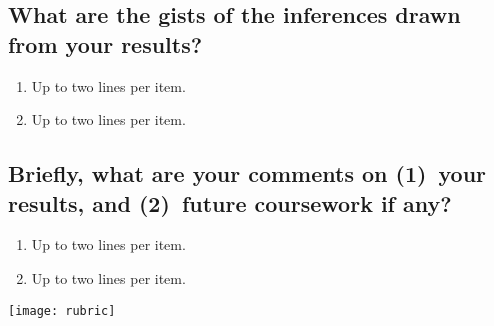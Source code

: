 \subsection{What are the gists of the inferences drawn from your results?}
\begin{enumerate}
	\item Up to two lines per item.
	\item Up to two lines per item.
\end{enumerate}

\subsection{Briefly, what are your comments on (1)~your results, and  (2)~future coursework if any?}
\begin{enumerate}
	\item Up to two lines per item.
	\item Up to two lines per item.
\end{enumerate}	




\newpage
\begin{figure*}[!t]
	\texttt{[image: rubric]} 
\end{figure*}
\cleardoublepage

